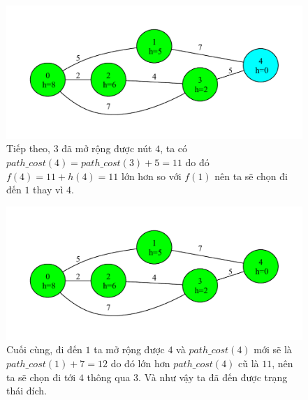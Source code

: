 \begin{figure}[H]
    \centering
    \includegraphics[scale=0.7]{figure/AStar/4.pdf}
    \caption{Tiếp theo, $3$ đã mở rộng được nút $4$, ta có $path\_cost(4) = path\_cost(3) + 5 = 11$ do đó $f(4) = 11 + h(4) = 11$ lớn hơn so với $f(1)$ nên ta sẽ chọn đi đến $1$ thay vì $4$.}
    \label{fig:AStar_4}
\end{figure}

\begin{figure}[H]
    \centering
    \includegraphics[scale=0.7]{figure/AStar/5.pdf}
    \caption{Cuối cùng, đi đến $1$ ta mở rộng được $4$ và $path\_cost(4)$ mới sẽ là $path\_cost(1) + 7 = 12$ do đó lớn hơn $path\_cost(4)$ cũ là $11$, nên ta sẽ chọn đi tới $4$ thông qua $3$. Và như vậy ta đã đến được trạng thái đích.}
    \label{fig:AStar_5}
\end{figure}

\newpage
